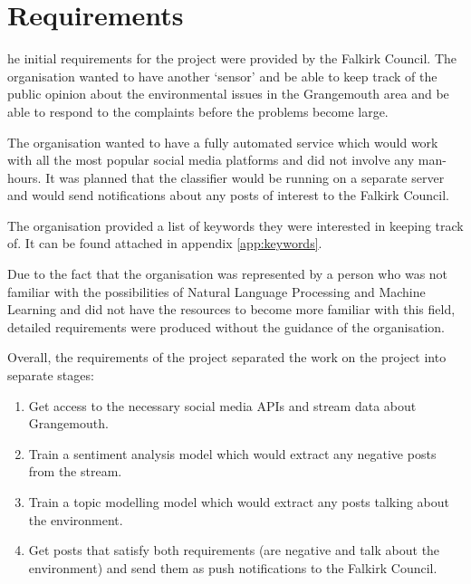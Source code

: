 \let\textcircled=\pgftextcircled
\chapter{Requirements}
\label{chap:requirements}

he initial requirements for the project were provided by the Falkirk Council. The organisation wanted to have another `sensor' and be able to keep track of the public opinion about the environmental issues in the Grangemouth area and be able to respond to the complaints before the problems become large. 

The organisation wanted to have a fully automated service which would work with all the most popular social media platforms and did not involve any man-hours. It was planned that the classifier would be running on a separate server and would send notifications about any posts of interest to the Falkirk Council.

The organisation provided a list of keywords they were interested in keeping track of. It can be found attached in appendix \ref{app:keywords}.

Due to the fact that the organisation was represented by a person who was not familiar with the possibilities of Natural Language Processing and Machine Learning and did not have the resources to become more familiar with this field, detailed requirements were produced without the guidance of the organisation. 

Overall, the requirements of the project separated the work on the project into separate stages:

\begin{enumerate}
    \item Get access to the necessary social media APIs and stream data about Grangemouth.
    \item Train a sentiment analysis model which would extract any negative posts from the stream.
    \item Train a topic modelling model which would extract any posts talking about the environment.
    \item Get posts that satisfy both requirements (are negative and talk about the environment) and send them as push notifications to the Falkirk Council.
\end{enumerate} 


